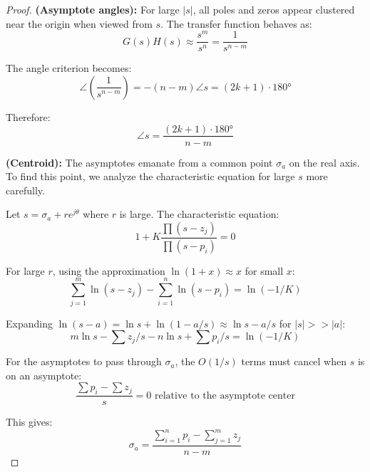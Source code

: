 \begin{proof}
\textbf{(Asymptote angles):} For large $|s|$, all poles and zeros appear clustered near the origin when viewed from $s$. The transfer function behaves as:
\[
G(s)H(s) \approx \frac{s^m}{s^n} = \frac{1}{s^{n-m}}
\]

The angle criterion becomes:
\[
\angle\left(\frac{1}{s^{n-m}}\right) = -(n-m)\angle s = (2k+1) \cdot 180°
\]

Therefore:
\[
\angle s = \frac{(2k+1) \cdot 180°}{n-m}
\]

\textbf{(Centroid):} The asymptotes emanate from a common point $\sigma_a$ on the real axis. To find this point, we analyze the characteristic equation for large $s$ more carefully.

Let $s = \sigma_a + re^{j\theta}$ where $r$ is large. The characteristic equation:
\[
1 + K\frac{\prod(s-z_j)}{\prod(s-p_i)} = 0
\]

For large $r$, using the approximation $\ln(1+x) \approx x$ for small $x$:
\[
\sum_{j=1}^{m} \ln(s-z_j) - \sum_{i=1}^{n} \ln(s-p_i) = \ln(-1/K)
\]

Expanding $\ln(s-a) = \ln s + \ln(1 - a/s) \approx \ln s - a/s$ for $|s| >> |a|$:
\[
m\ln s - \sum z_j/s - n\ln s + \sum p_i/s = \ln(-1/K)
\]

For the asymptotes to pass through $\sigma_a$, the $O(1/s)$ terms must cancel when $s$ is on an asymptote:
\[
\frac{\sum p_i - \sum z_j}{s} = 0 \text{ relative to the asymptote center}
\]

This gives:
\[
\sigma_a = \frac{\sum_{i=1}^{n} p_i - \sum_{j=1}^{m} z_j}{n - m}
\]
\end{proof}

